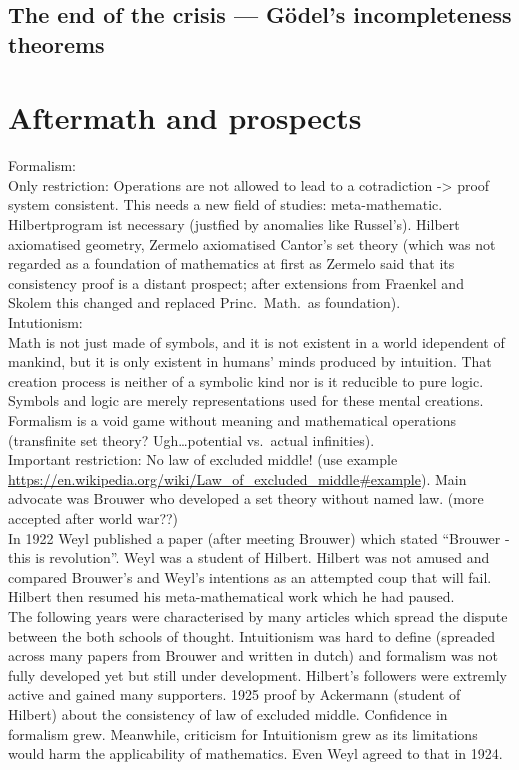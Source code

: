 \documentclass[hidelinks]{article}
\theoremstyle{plain}
\theoremstyle{definition}
\theoremstyle{rem}
\begin{document}
\subsection{The end of the crisis --- Gödel's incompleteness theorems}\label{ssec_end_crisis}

\section{Aftermath and prospects}

Formalism:\\
Only restriction: Operations are not allowed to lead to a cotradiction -> proof system consistent. This needs a new field of studies: meta-mathematic. Hilbertprogram ist necessary (justfied by anomalies like Russel's). Hilbert axiomatised geometry, Zermelo axiomatised Cantor's set theory (which was not regarded as a foundation of mathematics at first as Zermelo said that its consistency proof is a distant prospect; after extensions from Fraenkel and Skolem this changed and replaced Princ.\ Math.\ as foundation).  \\

Intutionism:\\
Math is not just made of symbols, and it is not existent in a world idependent of mankind, but it is only existent in humans' minds produced by intuition. That creation process is neither of a symbolic kind nor is it reducible to pure logic. Symbols and logic are merely representations used for these mental creations. Formalism is a void game without meaning and mathematical operations (transfinite set theory? Ugh\ldots potential vs.\ actual infinities).\\
Important restriction: No law of excluded middle! (use example \url{https://en.wikipedia.org/wiki/Law\_of\_excluded\_middle#example}). Main advocate was Brouwer who developed a set theory without named law. (more accepted after world war??)\\

In 1922 Weyl published a paper (after meeting Brouwer) which stated ``Brouwer - this is revolution''. Weyl was a student of Hilbert. Hilbert was not amused and compared Brouwer's and Weyl's intentions as an attempted coup that will fail. Hilbert then resumed his meta-mathematical work which he had paused.\\

The following years were characterised by many articles which spread the dispute between the both schools of thought. Intuitionism was hard to define (spreaded across many papers from Brouwer and written in dutch) and formalism was not fully developed yet but still under development. Hilbert's followers were extremly active and gained many supporters. 1925 proof by Ackermann (student of Hilbert) about the consistency of law of excluded middle. Confidence in formalism grew. Meanwhile, criticism for Intuitionism grew as its limitations would harm the applicability of mathematics. Even Weyl agreed to that in 1924.\\
\end{document}
